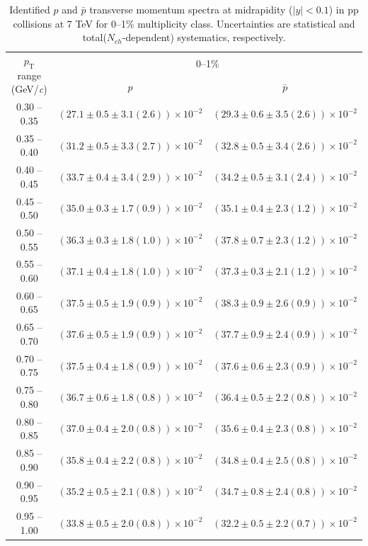 \begin{table}
\caption{Identified $p$ and $\bar{p}$  transverse momentum spectra at midrapidity ($|y|<0.1$) in pp collisions at 7 TeV for 0--1\% multiplicity class. Uncertainties are statistical and total($N_{ch}$-dependent) systematics, respectively.}
\label{tab:ProtonPlus_ProtonMinus_0to1}
\begin{center}
\begin{tabular}{ c | c c }
\hline
\multirow{2}{*}{$p_{\mathrm{T}}$ range (GeV/\textit{c})} & \multicolumn{2}{c}{0--1\%} \\ & $p$& $\bar{p}$\\ 
\hline
0.30 -- 0.35 & $(27.1\pm0.5\pm3.1(2.6))\times10^{-2}$ & $(29.3\pm0.6\pm3.5(2.6))\times10^{-2}$ \\ 
0.35 -- 0.40 & $(31.2\pm0.5\pm3.3(2.7))\times10^{-2}$ & $(32.8\pm0.5\pm3.4(2.6))\times10^{-2}$ \\ 
0.40 -- 0.45 & $(33.7\pm0.4\pm3.4(2.9))\times10^{-2}$ & $(34.2\pm0.5\pm3.1(2.4))\times10^{-2}$ \\ 
0.45 -- 0.50 & $(35.0\pm0.3\pm1.7(0.9))\times10^{-2}$ & $(35.1\pm0.4\pm2.3(1.2))\times10^{-2}$ \\ 
0.50 -- 0.55 & $(36.3\pm0.3\pm1.8(1.0))\times10^{-2}$ & $(37.8\pm0.7\pm2.3(1.2))\times10^{-2}$ \\ 
0.55 -- 0.60 & $(37.1\pm0.4\pm1.8(1.0))\times10^{-2}$ & $(37.3\pm0.3\pm2.1(1.2))\times10^{-2}$ \\ 
0.60 -- 0.65 & $(37.5\pm0.5\pm1.9(0.9))\times10^{-2}$ & $(38.3\pm0.9\pm2.6(0.9))\times10^{-2}$ \\ 
0.65 -- 0.70 & $(37.6\pm0.5\pm1.9(0.9))\times10^{-2}$ & $(37.7\pm0.9\pm2.4(0.9))\times10^{-2}$ \\ 
0.70 -- 0.75 & $(37.5\pm0.4\pm1.8(0.9))\times10^{-2}$ & $(37.6\pm0.6\pm2.3(0.9))\times10^{-2}$ \\ 
0.75 -- 0.80 & $(36.7\pm0.6\pm1.8(0.8))\times10^{-2}$ & $(36.4\pm0.5\pm2.2(0.8))\times10^{-2}$ \\ 
0.80 -- 0.85 & $(37.0\pm0.4\pm2.0(0.8))\times10^{-2}$ & $(35.6\pm0.4\pm2.3(0.8))\times10^{-2}$ \\ 
0.85 -- 0.90 & $(35.8\pm0.4\pm2.2(0.8))\times10^{-2}$ & $(34.8\pm0.4\pm2.5(0.8))\times10^{-2}$ \\ 
0.90 -- 0.95 & $(35.2\pm0.5\pm2.1(0.8))\times10^{-2}$ & $(34.7\pm0.8\pm2.4(0.8))\times10^{-2}$ \\ 
0.95 -- 1.00 & $(33.8\pm0.5\pm2.0(0.8))\times10^{-2}$ & $(32.2\pm0.5\pm2.2(0.7))\times10^{-2}$ \\ 

\end{tabular}
\end{center}
\end{table}
